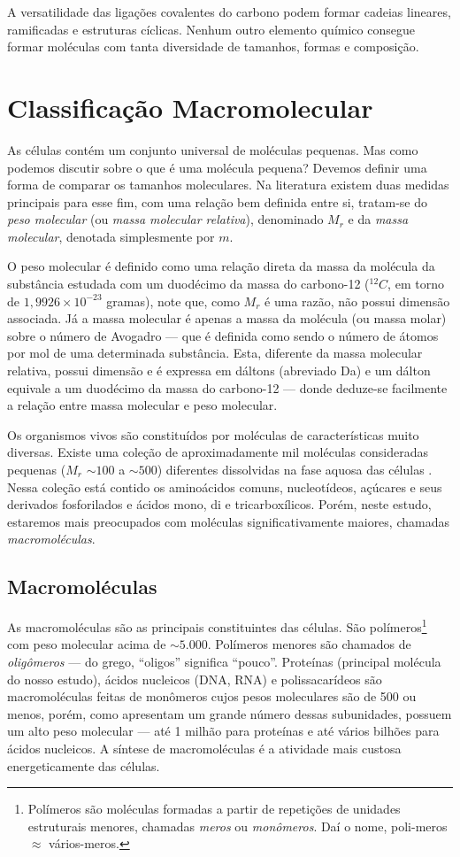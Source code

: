 A versatilidade das ligações covalentes do carbono podem formar cadeias lineares, ramificadas e estruturas cíclicas. Nenhum outro elemento químico consegue formar moléculas com tanta diversidade de tamanhos, formas e composição.

\section*{Classificação Macromolecular}
As células contém um conjunto universal de moléculas pequenas. Mas como podemos discutir sobre o que é uma molécula pequena? Devemos definir uma forma de comparar os tamanhos moleculares. Na literatura existem duas medidas principais para esse fim, com uma relação bem definida entre si, tratam-se do \textit{peso molecular} (ou \textit{massa molecular relativa}), denominado $M_r$ e da \textit{massa molecular}, denotada simplesmente por $m$.

O peso molecular é definido como uma relação direta da massa da molécula da substância estudada com um duodécimo da massa do carbono-12 ($^{12}C$, em torno de $1,9926\times 10^{-23}$ gramas), note que, como $M_r$ é uma razão, não possui dimensão associada. Já a massa molecular é apenas a massa da molécula (ou massa molar) sobre o número de Avogadro --- que é definida como sendo o número de átomos por mol de uma determinada substância. Esta, diferente da massa molecular relativa, possui dimensão e é expressa em dáltons (abreviado Da) e um dálton equivale a um duodécimo da massa do carbono-12 --- donde deduze-se facilmente a relação entre massa molecular e peso molecular.

Os organismos vivos são constituídos por moléculas de características muito diversas. Existe uma coleção de aproximadamente mil moléculas consideradas pequenas ($M_r$ ${\sim}100$ a ${\sim}500$) diferentes dissolvidas na fase aquosa das células \cite{bioquimicaLehninger}. Nessa coleção está contido os aminoácidos comuns, nucleotídeos, açúcares e seus derivados fosforilados e ácidos mono, di e tricarboxílicos. Porém, neste estudo, estaremos mais preocupados com moléculas significativamente maiores, chamadas \textit{macromoléculas}.
\subsection*{Macromoléculas}
As macromoléculas são as principais constituintes das células. São polímeros\footnote[1]{Polímeros são moléculas formadas a partir de repetições de unidades estruturais menores, chamadas \textit{meros} ou \textit{monômeros}. Daí o nome, poli-meros $\approx$ vários-meros.} com peso molecular acima de ${\sim}5.000$. Polímeros menores são chamados de \textit{oligômeros} --- do grego, ``oligos'' significa ``pouco''. Proteínas (principal molécula do nosso estudo), ácidos nucleicos (DNA, RNA) e polissacarídeos são macromoléculas feitas de monômeros cujos pesos moleculares são de 500 ou menos, porém, como apresentam um grande número dessas subunidades, possuem um alto peso molecular --- até 1 milhão para proteínas e até vários bilhões para ácidos nucleicos. A síntese de macromoléculas é a atividade mais custosa energeticamente das células.

